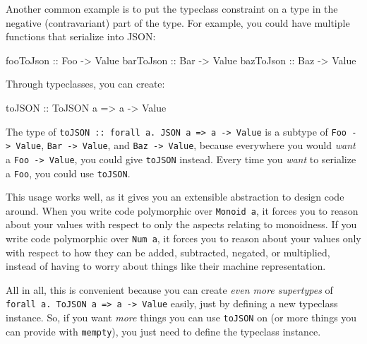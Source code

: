 \documentclass[]{article}
\newenvironment{Shaded}{}{}
\newcommand{\DataTypeTok}[1]{\textcolor[rgb]{0.56,0.13,0.00}{#1}}
\newcommand{\NormalTok}[1]{#1}
\newcommand{\OtherTok}[1]{\textcolor[rgb]{0.00,0.44,0.13}{#1}}
\begin{document}
Another common example is to put the typeclass constraint on a type in the
negative (contravariant) part of the type. For example, you could have multiple
functions that serialize into JSON:

\begin{Shaded}
\begin{Highlighting}[]
\OtherTok{fooToJson ::} \DataTypeTok{Foo} \OtherTok{{-}\textgreater{}} \DataTypeTok{Value}
\OtherTok{barToJson ::} \DataTypeTok{Bar} \OtherTok{{-}\textgreater{}} \DataTypeTok{Value}
\OtherTok{bazToJson ::} \DataTypeTok{Baz} \OtherTok{{-}\textgreater{}} \DataTypeTok{Value}
\end{Highlighting}
\end{Shaded}

Through typeclasses, you can create:

\begin{Shaded}
\begin{Highlighting}[]
\OtherTok{toJSON ::} \DataTypeTok{ToJSON}\NormalTok{ a }\OtherTok{=\textgreater{}}\NormalTok{ a }\OtherTok{{-}\textgreater{}} \DataTypeTok{Value}
\end{Highlighting}
\end{Shaded}

The type of
\texttt{toJSON\ ::\ forall\ a.\ JSON\ a\ =\textgreater{}\ a\ -\textgreater{}\ Value}
is a subtype of \texttt{Foo\ -\textgreater{}\ Value},
\texttt{Bar\ -\textgreater{}\ Value}, and \texttt{Baz\ -\textgreater{}\ Value},
because everywhere you would \emph{want} a \texttt{Foo\ -\textgreater{}\ Value},
you could give \texttt{toJSON} instead. Every time you \emph{want} to serialize
a \texttt{Foo}, you could use \texttt{toJSON}.

This usage works well, as it gives you an extensible abstraction to design code
around. When you write code polymorphic over \texttt{Monoid\ a}, it forces you
to reason about your values with respect to only the aspects relating to
monoidness. If you write code polymorphic over \texttt{Num\ a}, it forces you to
reason about your values only with respect to how they can be added, subtracted,
negated, or multiplied, instead of having to worry about things like their
machine representation.

All in all, this is convenient because you can create \emph{even more
supertypes} of
\texttt{forall\ a.\ ToJSON\ a\ =\textgreater{}\ a\ -\textgreater{}\ Value}
easily, just by defining a new typeclass instance. So, if you want \emph{more}
things you can use \texttt{toJSON} on (or more things you can provide with
\texttt{mempty}), you just need to define the typeclass instance.
\end{document}
